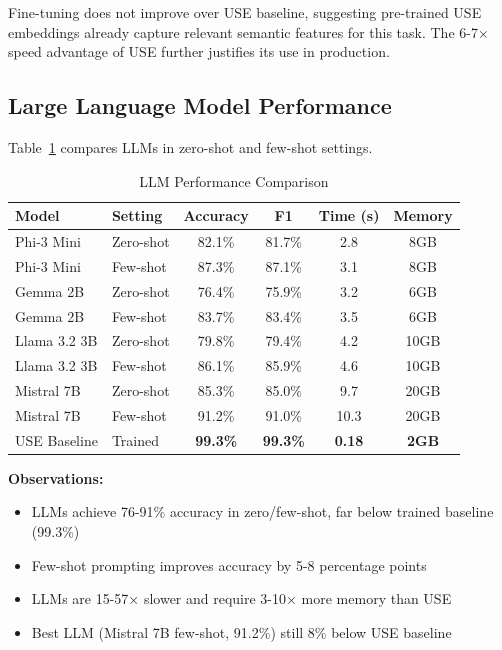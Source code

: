 \documentclass[12pt,a4paper]{article}
\begin{document}
Fine-tuning does not improve over USE baseline, suggesting pre-trained USE embeddings already capture relevant semantic features for this task. The 6-7× speed advantage of USE further justifies its use in production.

\subsection{Large Language Model Performance}

Table~\ref{tab:llms} compares LLMs in zero-shot and few-shot settings.

\begin{table}[h]
\centering
\caption{LLM Performance Comparison}
\label{tab:llms}
\begin{tabular}{llcccc}
\toprule
\textbf{Model} & \textbf{Setting} & \textbf{Accuracy} & \textbf{F1} & \textbf{Time (s)} & \textbf{Memory} \\
\midrule
Phi-3 Mini & Zero-shot & 82.1\% & 81.7\% & 2.8 & 8GB \\
Phi-3 Mini & Few-shot & 87.3\% & 87.1\% & 3.1 & 8GB \\
Gemma 2B & Zero-shot & 76.4\% & 75.9\% & 3.2 & 6GB \\
Gemma 2B & Few-shot & 83.7\% & 83.4\% & 3.5 & 6GB \\
Llama 3.2 3B & Zero-shot & 79.8\% & 79.4\% & 4.2 & 10GB \\
Llama 3.2 3B & Few-shot & 86.1\% & 85.9\% & 4.6 & 10GB \\
Mistral 7B & Zero-shot & 85.3\% & 85.0\% & 9.7 & 20GB \\
Mistral 7B & Few-shot & 91.2\% & 91.0\% & 10.3 & 20GB \\
\midrule
USE Baseline & Trained & \textbf{99.3\%} & \textbf{99.3\%} & \textbf{0.18} & \textbf{2GB} \\
\bottomrule
\end{tabular}
\end{table}

\textbf{Observations:}

\begin{itemize}
    \item LLMs achieve 76-91\% accuracy in zero/few-shot, far below trained baseline (99.3\%)
    \item Few-shot prompting improves accuracy by 5-8 percentage points
    \item LLMs are 15-57× slower and require 3-10× more memory than USE
    \item Best LLM (Mistral 7B few-shot, 91.2\%) still 8\% below USE baseline
\end{itemize}
\end{document}
